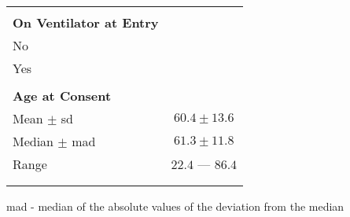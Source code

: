 \documentclass[dvips,10pt]{article}
\begin{document}
\begin{table}[tbp]
\begin{center}
\begin{tabular}{ @{}l@{}
@{}c@{}
}
 \vspace{0em} \\
\parbox[b]{ 70mm }{\raggedright{{\bf On Ventilator at Entry }}} &
  \\
 \hspace{1em} No &
  \\
 \hspace{1em} Yes &
  \\
 \vspace{0em} \\
\parbox[b]{ 70mm }{\raggedright{{\bf Age at Consent }}} &
  \\
 \hspace{1em} Mean $\pm$ sd &
 $ 60.4 \pm 13.6 $ \\
 \hspace{1em} Median $\pm$ mad &
 $ 61.3 \pm 11.8 $ \\
 \hspace{1em} Range &
 $ 22.4 $ --- $ 86.4 $ \\
 \vspace{0em} \\
\hline \\ 
\end{tabular}

\parbox{ 5in }{ mad - median of the absolute values of the deviation from the median } \\
 \vspace{1em}\end{center}
 \end{table}
\clearpage
\end{document}
